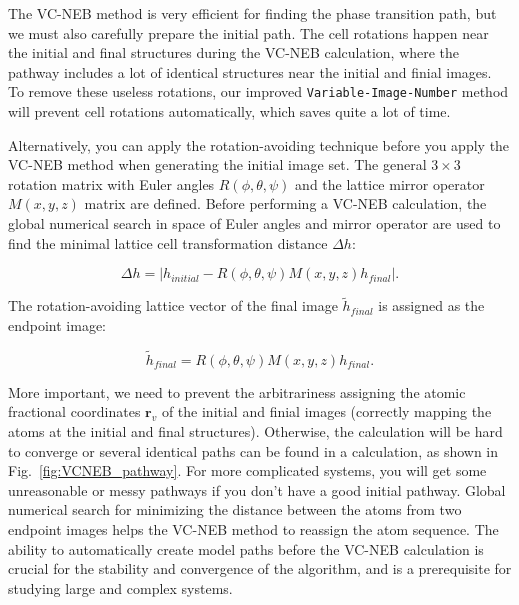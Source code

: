 \documentclass[12pt]{article}
\begin{document}
The VC-NEB method is very efficient for finding the phase transition path, but
we must also carefully prepare the initial path. The cell rotations happen near
the initial and final structures during the VC-NEB calculation, where the
pathway includes a lot of  identical structures near the initial and finial
images. To remove these useless rotations, our improved
\texttt{Variable-Image-Number} method will prevent cell rotations automatically,
which saves quite a lot of time.

Alternatively, you can apply the rotation-avoiding technique before you apply
the VC-NEB method when generating the initial image set. The general $3 \times
3$ rotation matrix with Euler angles $R(\phi, \theta, \psi)$ and the lattice
mirror operator $M(x, y, z)$ matrix are defined. Before performing a VC-NEB
calculation, the global numerical search in space of Euler angles and mirror
operator are used to find the minimal lattice cell transformation distance
$\Delta h$:

\begin{equation}
\Delta h = \left| {h_{initial} - R(\phi,\theta,\psi) M(x,y,z)h_{final}}\right|.
\end{equation}

The rotation-avoiding lattice vector of the final image $\tilde h_{final}$ is
assigned as the endpoint image:

\begin{equation}
\tilde h_{final} = R(\phi,\theta,\psi)M(x,y,z)h_{final}.
\end{equation}

More important, we need to prevent the arbitrariness assigning the atomic
fractional coordinates $\mathbf{r}_{v}$ of the initial and finial images
(correctly mapping the atoms at the initial and final structures). Otherwise,
the calculation will be hard to converge or several identical paths can be found
in a calculation, as shown in Fig.~\ref{fig:VCNEB_pathway}. For more complicated
systems, you will get some unreasonable or messy pathways if you don't have a
good initial pathway. Global numerical search for minimizing the distance
between the atoms from two endpoint images helps the VC-NEB method to reassign
the atom sequence. The ability to automatically create model paths before the
VC-NEB calculation is crucial for the stability and convergence of the
algorithm, and is a prerequisite for studying large and complex systems.
\end{document}
